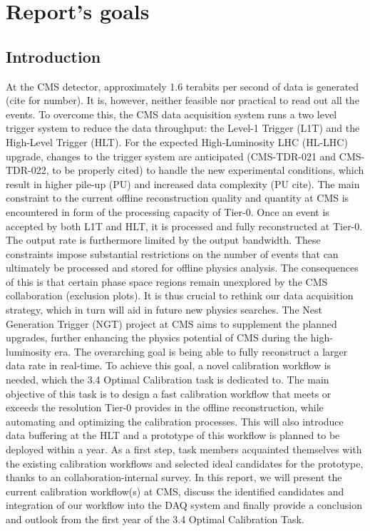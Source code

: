 \chapter{Report's goals}

\section{Introduction}
At the CMS detector, approximately 1.6 terabits per second of data is generated (cite for number). It is, however, neither feasible nor practical to read out all the events. To overcome this, the CMS data acquisition system runs a two level trigger system to reduce the data throughput: the Level-1 Trigger (L1T) and the High-Level Trigger (HLT). For the expected High-Luminosity LHC (HL-LHC) upgrade, changes to the trigger system are anticipated (CMS-TDR-021 and CMS-TDR-022, to be properly cited) to handle the new experimental conditions, which result in higher pile-up (PU) and increased data complexity (PU cite). 
\newline \newline 
The main constraint to the current offline reconstruction quality and quantity at CMS is encountered in form of the processing capacity of Tier-0. Once an event is accepted by both L1T and HLT, it is processed and fully reconstructed at Tier-0. The output rate is furthermore limited by the output bandwidth. These constraints impose substantial restrictions on the number of events that can ultimately be processed and stored for offline physics analysis. The consequences of this is that certain phase space regions remain unexplored by the CMS collaboration (exclusion plots). It is thus crucial to rethink our data acquisition strategy, which in turn will aid in future new physics searches. The Nest Generation Trigger (NGT) project at CMS aims to supplement the planned upgrades, further enhancing the physics potential of CMS during the high-luminosity era. The overarching goal is being able to fully reconstruct a larger data rate in real-time.
\newline \newline
To achieve this goal, a novel calibration workflow is needed, which the 3.4 Optimal Calibration task is dedicated to. The main objective of this task is to design a fast calibration workflow that meets or exceeds the resolution Tier-0 provides in the offline reconstruction, while automating and optimizing the calibration processes. This will also introduce data buffering at the HLT and a prototype of this workflow is planned to be deployed within a year. As a first step, task members acquainted themselves with the existing calibration workflows and selected ideal candidates for the prototype, thanks to an collaboration-internal survey. In this report, we will present the current calibration workflow(s) at CMS, discuss the identified candidates and integration of our workflow into the DAQ system and finally provide a conclusion and outlook from the first year of the 3.4 Optimal Calibration Task.


